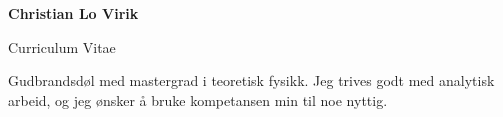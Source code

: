 \documentclass[a4paper,10pt]{article}
\begin{document}
\begin{center}
    {\LARGE \textbf{Christian Lo Virik}}
    
    \vspace{0.2cm}
    {\large Curriculum Vitae}
\end{center}

\vspace{0.3cm}

Gudbrandsdøl med mastergrad i teoretisk fysikk. Jeg trives godt med analytisk arbeid, og jeg ønsker å bruke kompetansen min til noe nyttig.




\vspace{0.5cm}
\end{document}
